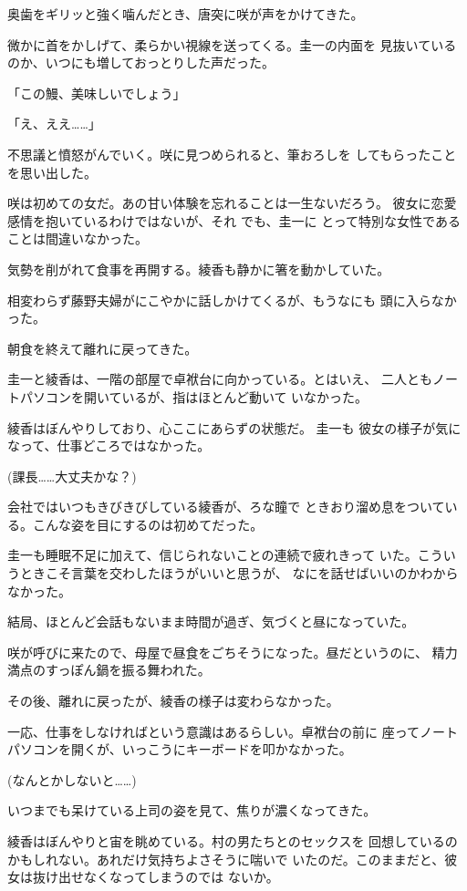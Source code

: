 ﻿\documentclass[
    book,tate,
    line_length=30zw,
    jafontsize=12pt,
    paper=b5j,
    landscape,
    ]{jlreq}
\begin{document}
奥歯をギリッと強く噛んだとき、唐突に咲が声をかけてきた。

微かに首をかしげて、柔らかい視線を送ってくる。圭一の内面を
見抜いているのか、いつにも増しておっとりした声だった。

「この鰻、美味しいでしょう」

「え、ええ……」

不思議と憤怒がんでいく。咲に見つめられると、筆おろしを
してもらったことを思い出した。

咲は初めての女だ。あの甘い体験を忘れることは一生ないだろう。
彼女に恋愛感情を抱いているわけではないが、それ でも、圭一に
とって特別な女性であることは間違いなかった。

気勢を削がれて食事を再開する。綾香も静かに箸を動かしていた。

相変わらず藤野夫婦がにこやかに話しかけてくるが、もうなにも
頭に入らなかった。

朝食を終えて離れに戻ってきた。

圭一と綾香は、一階の部屋で卓袱台に向かっている。とはいえ、
二人ともノートパソコンを開いているが、指はほとんど動いて
いなかった。

綾香はぼんやりしており、心ここにあらずの状態だ。 圭一も
彼女の様子が気になって、仕事どころではなかった。

(課長……大丈夫かな？)

会社ではいつもきびきびしている綾香が、ろな瞳で
ときおり溜め息をついている。こんな姿を目にするのは初めてだった。

圭一も睡眠不足に加えて、信じられないことの連続で疲れきって
いた。こういうときこそ言葉を交わしたほうがいいと思うが、
なにを話せばいいのかわからなかった。

結局、ほとんど会話もないまま時間が過ぎ、気づくと昼になっていた。

咲が呼びに来たので、母屋で昼食をごちそうになった。昼だというのに、
精力満点のすっぽん鍋を振る舞われた。

その後、離れに戻ったが、綾香の様子は変わらなかった。

一応、仕事をしなければという意識はあるらしい。卓袱台の前に
座ってノートパソコンを開くが、いっこうにキーボードを叩かなかった。

(なんとかしないと……)

いつまでも呆けている上司の姿を見て、焦りが濃くなってきた。

綾香はぼんやりと宙を眺めている。村の男たちとのセックスを
回想しているのかもしれない。あれだけ気持ちよさそうに喘いで
いたのだ。このままだと、彼女は抜け出せなくなってしまうのでは
ないか。
\end{document}
